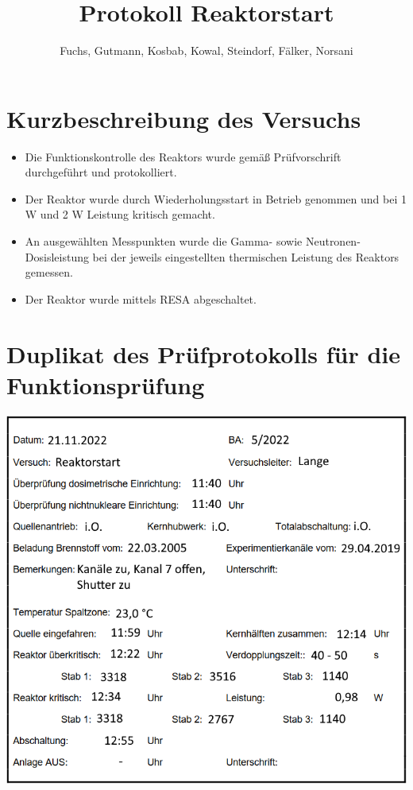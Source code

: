 \documentclass[12pt,german]{article}
\title{Protokoll Reaktorstart}
\author{Fuchs, Gutmann, Kosbab, Kowal, Steindorf, Fälker, Norsani}
\begin{document}
	\maketitle
	\tableofcontents
	
	\section{Kurzbeschreibung des Versuchs}
	\begin{itemize}
		\item Die Funktionskontrolle des Reaktors wurde gemäß Prüfvorschrift durchgeführt und protokolliert.
		\item Der Reaktor wurde durch Wiederholungsstart in Betrieb genommen und bei 1 W und 2 W Leistung kritisch gemacht.
		\item An ausgewählten Messpunkten wurde die Gamma- sowie Neutronen-Dosisleistung bei der jeweils eingestellten thermischen Leistung des Reaktors gemessen.
		\item Der Reaktor wurde mittels RESA abgeschaltet.
	\end{itemize}

	\section{Duplikat des Prüfprotokolls für die Funktionsprüfung}
	\includegraphics{BJ_Reaktorstart.png}
	
\end{document}
